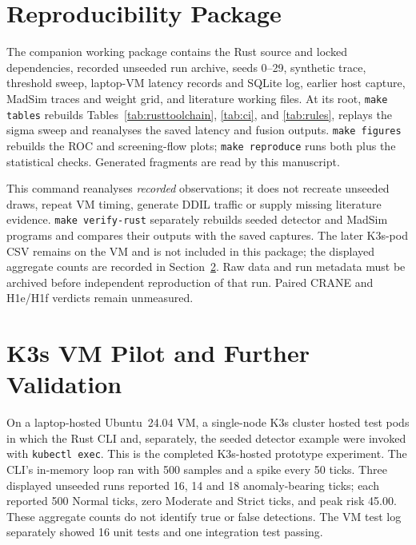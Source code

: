 \documentclass{ieeeaccess}
\begin{document}
\section{Reproducibility Package}
\label{sec:reproducibility}

The companion working package contains the Rust source and locked dependencies, recorded unseeded run archive, seeds 0--29, synthetic trace, threshold sweep, laptop-VM latency records and SQLite log, earlier host capture, MadSim traces and weight grid, and literature working files. At its root, \texttt{make tables} rebuilds Tables~\ref{tab:rusttoolchain}, \ref{tab:ci}, and \ref{tab:rules}, replays the sigma sweep and reanalyses the saved latency and fusion outputs. \texttt{make figures} rebuilds the ROC and screening-flow plots; \texttt{make reproduce} runs both plus the statistical checks. Generated fragments are read by this manuscript.

This command reanalyses \emph{recorded} observations; it does not recreate unseeded draws, repeat VM timing, generate DDIL traffic or supply missing literature evidence. \texttt{make verify-rust} separately rebuilds seeded detector and MadSim programs and compares their outputs with the saved captures. The later K3s-pod CSV remains on the VM and is not included in this package; the displayed aggregate counts are recorded in Section~\ref{sec:production}. Raw data and run metadata must be archived before independent reproduction of that run. Paired CRANE and H1e/H1f verdicts remain unmeasured.

\section{K3s VM Pilot and Further Validation}
\label{sec:production}

On a laptop-hosted Ubuntu~24.04 VM, a single-node K3s cluster hosted test pods in which the Rust CLI and, separately, the seeded detector example were invoked with \texttt{kubectl exec}. This is the completed K3s-hosted prototype experiment. The CLI's in-memory loop ran with 500 samples and a spike every 50 ticks. Three displayed unseeded runs reported 16, 14 and 18 anomaly-bearing ticks; each reported 500 Normal ticks, zero Moderate and Strict ticks, and peak risk 45.00. These aggregate counts do not identify true or false detections. The VM test log separately showed 16 unit tests and one integration test passing.
\end{document}
